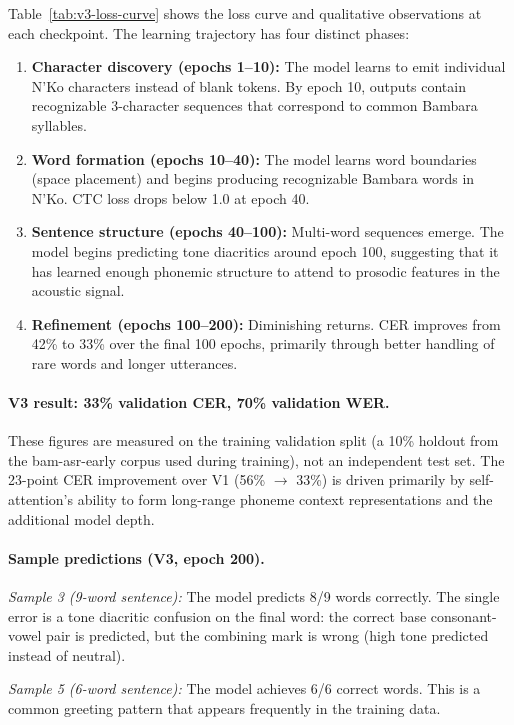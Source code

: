 \documentclass[11pt]{article}
\begin{document}
Table~\ref{tab:v3-loss-curve} shows the loss curve and qualitative observations at each checkpoint.
The learning trajectory has four distinct phases:

\begin{enumerate}
\item \textbf{Character discovery (epochs 1--10):} The model learns to emit individual N'Ko characters instead of blank tokens. By epoch 10, outputs contain recognizable 3-character sequences that correspond to common Bambara syllables.
\item \textbf{Word formation (epochs 10--40):} The model learns word boundaries (space placement) and begins producing recognizable Bambara words in N'Ko. CTC loss drops below 1.0 at epoch 40.
\item \textbf{Sentence structure (epochs 40--100):} Multi-word sequences emerge. The model begins predicting tone diacritics around epoch 100, suggesting that it has learned enough phonemic structure to attend to prosodic features in the acoustic signal.
\item \textbf{Refinement (epochs 100--200):} Diminishing returns. CER improves from 42\% to 33\% over the final 100 epochs, primarily through better handling of rare words and longer utterances.
\end{enumerate}

\paragraph{V3 result: 33\% validation CER, 70\% validation WER.}
These figures are measured on the training validation split (a 10\% holdout from the bam-asr-early corpus used during training), not an independent test set.
The 23-point CER improvement over V1 (56\% $\to$ 33\%) is driven primarily by self-attention's ability to form long-range phoneme context representations and the additional model depth.

\paragraph{Sample predictions (V3, epoch 200).}

\textit{Sample 3 (9-word sentence):}
The model predicts 8/9 words correctly.
The single error is a tone diacritic confusion on the final word: the correct base consonant-vowel pair is predicted, but the combining mark is wrong (high tone predicted instead of neutral).

\textit{Sample 5 (6-word sentence):}
The model achieves 6/6 correct words.
This is a common greeting pattern that appears frequently in the training data.
\end{document}
